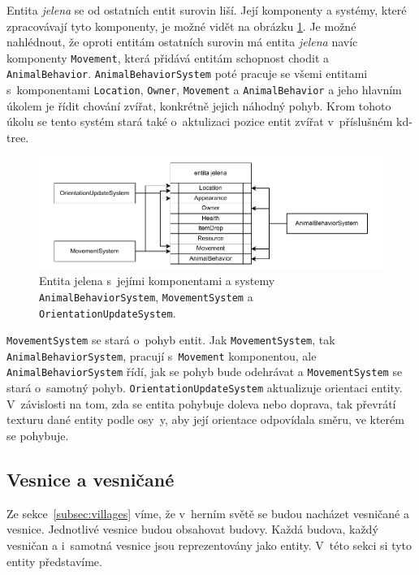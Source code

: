 Entita \textit{jelena} se od ostatních entit surovin liší. Její komponenty a systémy, které zpracovávají tyto komponenty, je možné vidět na obrázku \ref{fig:deer}. Je možné nahlédnout, že oproti entitám ostatních surovin má entita \textit{jelena} navíc komponenty \texttt{Movement}, která přidává entitám schopnost chodit a \texttt{AnimalBehavior}. \texttt{AnimalBehaviorSystem} poté pracuje se všemi entitami s~komponentami \texttt{Location}, \texttt{Owner}, \texttt{Movement} a \texttt{AnimalBehavior} a jeho hlavním úkolem je řídit chování zvířat, konkrétně jejich náhodný pohyb. Krom tohoto úkolu se tento systém stará také o~aktulizaci pozice entit zvířat v~příslušném kd-tree.

\begin{figure}[!htb]
  \centering
  \includegraphics[width=1.0\linewidth]{img/deer.pdf}
  \caption{Entita jelena s~jejími komponentami a systemy \texttt{AnimalBehaviorSystem}, \texttt{MovementSystem} a \texttt{OrientationUpdateSystem}.}
  \label{fig:deer}
\end{figure}

\texttt{MovementSystem} se stará o~pohyb entit. Jak \texttt{MovementSystem}, tak \linebreak \texttt{AnimalBehaviorSystem}, pracují s~\texttt{Movement} komponentou, ale \linebreak \texttt{AnimalBehaviorSystem} řídí, jak se pohyb bude odehrávat a \texttt{MovementSystem} se stará o~samotný pohyb. \texttt{OrientationUpdateSystem} aktualizuje orientaci entity. V~závislosti na tom, zda se entita pohybuje doleva nebo doprava, tak převrátí texturu dané entity podle osy~y, aby její orientace odpovídala směru, ve kterém se pohybuje.

\subsection{Vesnice a vesničané}
Ze sekce~\ref{subsec:villages} víme, že v~herním světě se budou nacházet vesničané a vesnice. Jednotlivé vesnice budou obsahovat budovy. Každá budova, každý vesničan a i~samotná vesnice jsou reprezentovány jako entity. V~této sekci si tyto entity představíme.

